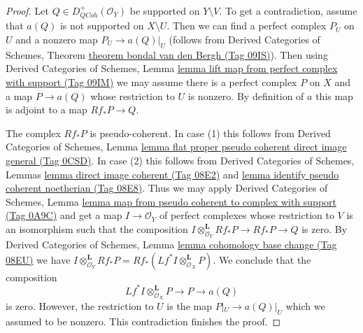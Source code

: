 \documentclass{amsart}
\theoremstyle{plain}
\theoremstyle{definition}
\theoremstyle{remark}
\numberwithin{equation}{subsection}
\def\QCoh{\mathit{QCoh}}
\begin{document}
\begin{proof}
Let $Q \in D^+_\QCoh(\mathcal{O}_Y)$ be supported on $Y \setminus V$.
To get a contradiction, assume that $a(Q)$ is not supported on
$X \setminus U$. Then we can find a perfect complex $P_U$ on $U$
and a nonzero map $P_U \to a(Q)|_U$ (follows from
Derived Categories of Schemes, Theorem
\href{https://stacks.math.columbia.edu/tag/09IS}{theorem bondal van den Bergh (Tag 09IS)}). Then using
Derived Categories of Schemes, Lemma
\href{https://stacks.math.columbia.edu/tag/09IM}{lemma lift map from perfect complex with support (Tag 09IM)}
we may assume there is a perfect complex $P$ on $X$ and a map
$P \to a(Q)$ whose restriction to $U$ is nonzero.
By definition of $a$ this map
is adjoint to a map $Rf_*P \to Q$.

\medskip\noindent
The complex $Rf_*P$ is pseudo-coherent. In case (1) this follows
from Derived Categories of Schemes, Lemma
\href{https://stacks.math.columbia.edu/tag/0CSD}{lemma flat proper pseudo coherent direct image general (Tag 0CSD)}.
In case (2) this follows from
Derived Categories of Schemes, Lemmas
\href{https://stacks.math.columbia.edu/tag/08E2}{lemma direct image coherent (Tag 08E2)} and
\href{https://stacks.math.columbia.edu/tag/08E8}{lemma identify pseudo coherent noetherian (Tag 08E8)}.
Thus we may apply
Derived Categories of Schemes, Lemma
\href{https://stacks.math.columbia.edu/tag/0A9C}{lemma map from pseudo coherent to complex with support (Tag 0A9C)}
and get a map $I \to \mathcal{O}_Y$ of perfect complexes
whose restriction to $V$ is an isomorphism such that the composition
$I \otimes^\mathbf{L}_{\mathcal{O}_Y} Rf_*P \to Rf_*P \to Q$ is zero.
By Derived Categories of Schemes, Lemma
\href{https://stacks.math.columbia.edu/tag/08EU}{lemma cohomology base change (Tag 08EU)}
we have $I \otimes^\mathbf{L}_{\mathcal{O}_Y} Rf_*P =
Rf_*(Lf^*I \otimes^\mathbf{L}_{\mathcal{O}_X} P)$.
We conclude that the composition
$$
Lf^*I \otimes^\mathbf{L}_{\mathcal{O}_X} P \to P \to a(Q)
$$
is zero. However, the restriction to $U$ is the map
$P|_U \to a(Q)|_U$ which we assumed to be nonzero.
This contradiction finishes the proof.
\end{proof}
\end{document}
